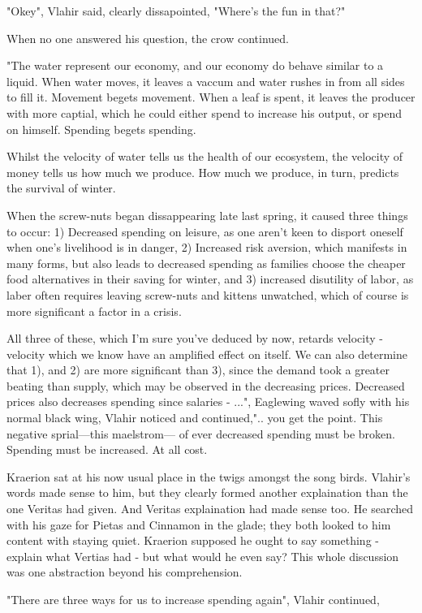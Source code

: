 "Okey", Vlahir said, clearly dissapointed, "Where's the fun in that?"

When no one answered his question, the crow continued.

"The water represent our economy, and our economy do behave similar to a liquid. When water moves, it leaves a vaccum and water rushes in from all sides to fill it. Movement begets movement. When a leaf is spent, it leaves the producer with more captial, which he could either spend to increase his output, or spend on himself. Spending begets spending.

Whilst the velocity of water tells us the health of our ecosystem, the velocity of money tells us how much we produce. How much we produce, in turn, predicts the survival of winter.

When the screw-nuts began dissappearing late last spring, it caused three things to occur: 1) Decreased spending on leisure, as one aren't keen to disport oneself when one's livelihood is in danger, 2) Increased risk aversion, which manifests in many forms, but also leads to decreased spending as families choose the cheaper food alternatives in their saving for winter, and 3) increased disutility of labor, as laber often requires leaving screw-nuts and kittens unwatched, which of course is more significant a factor in a crisis.

All three of these, which I'm sure you've deduced by now, retards velocity - velocity which we know have an amplified effect on itself. We can also determine that 1), and 2) are more significant than 3), since the demand took a greater beating than supply, which may be observed in the decreasing prices. Decreased prices also decreases spending since salaries - ...", Eaglewing waved sofly with his normal black wing, Vlahir noticed and continued,".. you get the point. This negative sprial—this maelstrom— of ever decreased spending must be broken. Spending must be increased. At all cost.


Kraerion sat at his now usual place in the twigs amongst the song birds. Vlahir's words made sense to him, but they clearly formed another explaination than the one Veritas had given. And Veritas explaination had made sense too. He searched with his gaze for Pietas and Cinnamon in the glade; they both looked to him content with staying quiet. Kraerion supposed he ought to say something - explain what Vertias had - but what would he even say? This whole discussion was one abstraction beyond his comprehension.


"There are three ways for us to increase spending again", Vlahir continued, 

